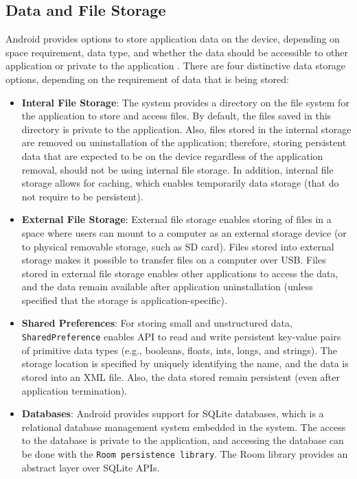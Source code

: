 \subsection{Data and File Storage}
Android provides options to store application data on the device, depending on space requirement, data type, and whether the data should be accessible to other application or private to the application \cite{filestorage}. There are four distinctive data storage options, depending on the requirement of data that is being stored:
\begin{itemize}
    \item \textbf{Interal File Storage}: The system provides a directory on the file system for the application to store and access files. By default, the files saved in this directory is private to the application. Also, files stored in the internal storage are removed on uninstallation of the application; therefore, storing persistent data that are expected to be on the device regardless of the application removal, should not be using internal file storage. In addition, internal file storage allows for caching, which enables temporarily data storage (that do not require to be persistent). 
    \item \textbf{External File Storage}: External file storage enables storing of files in a space where users can mount to a computer as an external storage device (or to physical removable storage, such as SD card). Files stored into external storage makes it possible to transfer files on a computer over USB. Files stored in external file storage enables other applications to access the data, and the data remain available after application uninstallation (unless specified that the storage is application-specific). 
    \item \textbf{Shared Preferences}: For storing small and unstructured data, \verb|SharedPreference| enables API to read and write persistent key-value pairs of primitive data types (e.g., booleans, floats, ints, longs, and strings). The storage location is specified by uniquely identifying the name, and the data is stored into an XML file. Also, the data stored remain persistent (even after application termination). 
    \item \textbf{Databases}: Android provides support for SQLite databases, which is a relational database management system embedded in the system. The access to the database is private to the application, and accessing the database can be done with the \verb|Room persistence library|. The Room library provides an abstract layer over SQLite APIs.  
\end{itemize}


